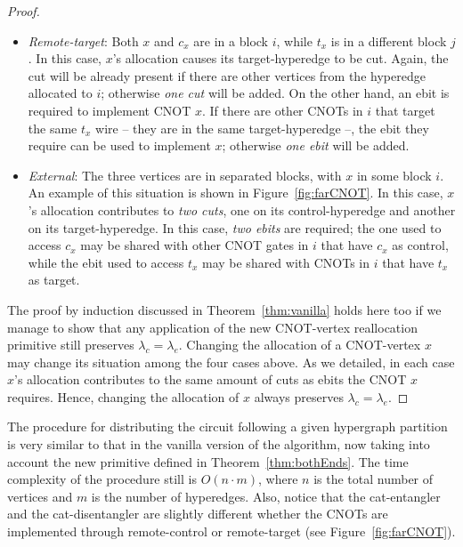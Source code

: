 \begin{proof}
\begin{itemize}
  \item \textit{Remote-target}: Both \(x\) and \(c_x\) are in a block \(i\), while \(t_x\) is in a different block \(j\). In this case, \(x\)'s allocation causes its target-hyperedge to be cut. Again, the cut will be already present if there are other vertices from the hyperedge allocated to \(i\); otherwise \textit{one cut} will be added. On the other hand, an ebit is required to implement CNOT \(x\). If there are other CNOTs in \(i\) that target the same \(t_x\) wire -- they are in the same target-hyperedge --, the ebit they require can be used to implement \(x\); otherwise \textit{one ebit} will be added.

  \item \textit{External}: The three vertices are in separated blocks, with \(x\) in some block \(i\). An example of this situation is shown in Figure~\ref{fig:farCNOT}. In this case, \(x\)'s allocation contributes to \textit{two cuts}, one on its control-hyperedge and another on its target-hyperedge. In this case, \textit{two ebits} are required; the one used to access \(c_x\) may be shared with other CNOT gates in \(i\) that have \(c_x\) as control, while the ebit used to access \(t_x\) may be shared with CNOTs in \(i\) that have \(t_x\) as target.
\end{itemize} 

The proof by induction discussed in Theorem~\ref{thm:vanilla} holds here too if we manage to show that any application of the new CNOT-vertex reallocation primitive still preserves \(\lambda_c = \lambda_e\). Changing the allocation of a CNOT-vertex \(x\) may change its situation among the four cases above. As we detailed, in each case \(x\)'s allocation contributes to the same amount of cuts as ebits the CNOT \(x\) requires. Hence, changing the allocation of \(x\) always preserves \(\lambda_c = \lambda_e\).

\end{proof}



The procedure for distributing the circuit following a given hypergraph partition is very similar to that in the vanilla version of the algorithm, now taking into account the new primitive defined in Theorem~\ref{thm:bothEnds}. The time complexity of the procedure still is \(O(n\cdot m)\), where \(n\) is the total number of vertices and \(m\) is the number of hyperedges. Also, notice that the cat-entangler and the cat-disentangler are slightly different whether the CNOTs are implemented through remote-control or remote-target (see Figure~\ref{fig:farCNOT}).

